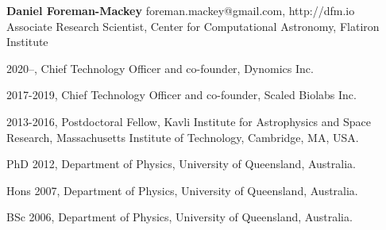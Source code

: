 \documentclass[12pt,letterpaper]{article}
\begin{document}
\thispagestyle{empty}\sloppy\sloppypar\raggedbottom

\textbf{\Large Daniel Foreman-Mackey} \hfill
\textsf{\small foreman.mackey@gmail.com, http://dfm.io} \\[0.5ex]
Associate Research Scientist, Center for Computational Astronomy, Flatiron Institute\\[0.5ex]

\begin{list}{}{\cvlist}
\item
2020--, Chief Technology Officer and co-founder, Dynomics Inc.
\item
2017-2019, Chief Technology Officer and co-founder, Scaled Biolabs Inc.
\item
2013-2016, Postdoctoral Fellow, Kavli Institute for Astrophysics and Space Research, Massachusetts Institute of Technology, Cambridge, MA, USA.
\item
PhD 2012, Department of Physics, University of Queensland, Australia.
\item
Hons 2007, Department of Physics, University of Queensland, Australia.
\item
BSc 2006, Department of Physics, University of Queensland, Australia.
\end{list}

\begin{list}{}{\cvlist}

\end{list}
\end{document}
